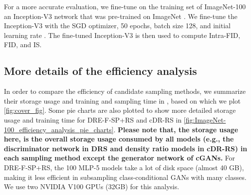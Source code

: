 \documentclass[final,12pt, 3p,times]{elsarticle}
\begin{document}
For a more accurate evaluation, we fine-tune on the training set of ImageNet-100 \cite{cao2017hashnet} an Inception-V3 network that was pre-trained on ImageNet \cite{imagenet_cvpr09}. We fine-tune the Inception-V3 with the SGD optimizer, 50 epochs, batch size 128, and initial learning rate . The fine-tuned Inception-V3 is then used to compute Intra-FID, FID, and IS.


\subsection{More details of the efficiency analysis}

In order to compare the efficiency of candidate sampling methods, we summarize their storage usage and training and sampling time in , based on which we plot \cref{fig:cover_fig}. Some pie charts are also plotted to show more detailed storage usage and training time for DRE-F-SP+RS and cDR-RS in \cref{fig:ImageNet-100_efficiency_analysis_pie_charts}. \textbf{Please note that, the storage usage here, is the overall storage usage consumed by all models (e.g., the discriminator network in DRS and density ratio models in cDR-RS) in each sampling method except the generator network of cGANs.} For DRE-F-SP+RS, the 100 MLP-5 models take a lot of disk space (almost 40 GB), making it less efficient in subsampling class-conditional GANs with many classes. We use two NVIDIA V100 GPUs (32GB) for this analysis. 
\end{document}
